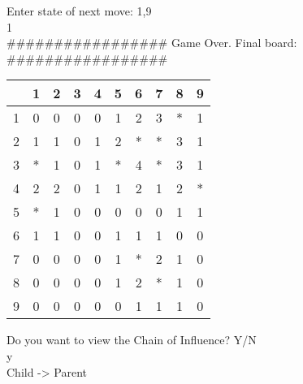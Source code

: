 Enter state of next move: 1,9\\
1\\
\#\#\#\#\#\#\#\#\#\#\#\#\#\#\#\#\# Game Over. Final board: \#\#\#\#\#\#\#\#\#\#\#\#\#\#\#\#\#\\
\begin{tabular}{|c|c|c|c|c|c|c|c|c|c|}
\hline
  & 1 & 2 & 3 & 4 & 5 & 6 & 7 & 8 & 9\\
\hline
1 & 0 & 0 & 0 & 0 & 1 & 2 & 3 & * & 1\\
\hline
2 & 1 & 1 & 0 & 1 & 2 & * & * & 3 & 1\\
\hline
3 & * & 1 & 0 & 1 & * & 4 & * & 3 & 1\\
\hline
4 & 2 & 2 & 0 & 1 & 1 & 2 & 1 & 2 & *\\
\hline
5 & * & 1 & 0 & 0 & 0 & 0 & 0 & 1 & 1\\
\hline
6 & 1 & 1 & 0 & 0 & 1 & 1 & 1 & 0 & 0\\
\hline
7 & 0 & 0 & 0 & 0 & 1 & * & 2 & 1 & 0\\
\hline
8 & 0 & 0 & 0 & 0 & 1 & 2 & * & 1 & 0\\
\hline
9 & 0 & 0 & 0 & 0 & 0 & 1 & 1 & 1 & 0\\
\hline
\end{tabular}

Do you want to view the Chain of Influence? Y/N\\
y\\

Child   ->   Parent\\

